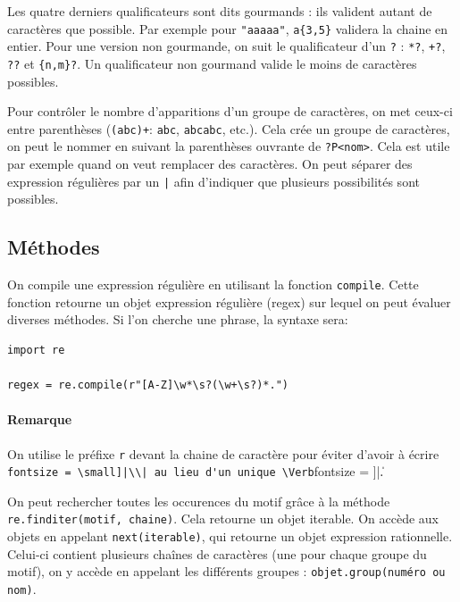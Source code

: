 \documentclass[a4paper, 10pt]{article}
\newcommand{\code}[1]{{\small\texttt{#1}}}
\begin{document}
Les quatre derniers qualificateurs sont dits gourmands : ils valident autant de caractères que possible. Par exemple pour \code{"aaaaa"}, \code{a\{3,5\}} validera la chaine en entier. Pour une version non gourmande, on suit le qualificateur d'un \code{?} : \code{*?}, \code{+?}, \code{??} et \code{\{n,m\}?}. Un qualificateur non gourmand valide le moins de caractères possibles.\bigskip

Pour contrôler le nombre d'apparitions d'un groupe de caractères, on met ceux-ci entre parenthèses (\code{(abc)+}: \code{abc}, \code{abcabc}, etc.). Cela crée un groupe de caractères, on peut le nommer en suivant la parenthèses ouvrante de \code{?P<nom>}. Cela est utile par exemple quand on veut remplacer des caractères. On peut séparer des expression régulières par un \code{|} afin d'indiquer que plusieurs possibilités sont possibles.\bigskip

\subsection{Méthodes}
On compile une expression régulière en utilisant la fonction \code{compile}. Cette fonction retourne un objet expression régulière (regex) sur lequel on peut évaluer diverses méthodes. Si l'on cherche une phrase, la syntaxe sera:

\begin{verbatim}
import re

regex = re.compile(r"[A-Z]\w*\s?(\w+\s?)*.")
\end{verbatim}

\paragraph{Remarque} On utilise le préfixe \code{r} devant la chaine de caractère pour éviter d'avoir à écrire \Verb[fontsize = \small]|\\| au lieu d'un unique \Verb[fontsize = \small]|\|.\bigskip

On peut rechercher toutes les occurences du motif grâce à la méthode \code{re.finditer(motif, chaine)}. Cela retourne un objet iterable. On accède aux objets en appelant \code{next(iterable)}, qui retourne un objet expression rationnelle. Celui-ci contient plusieurs chaînes de caractères (une pour chaque groupe du motif), on y accède en appelant les différents groupes : \code{objet.group(numéro ou nom)}.\bigskip
\end{document}
